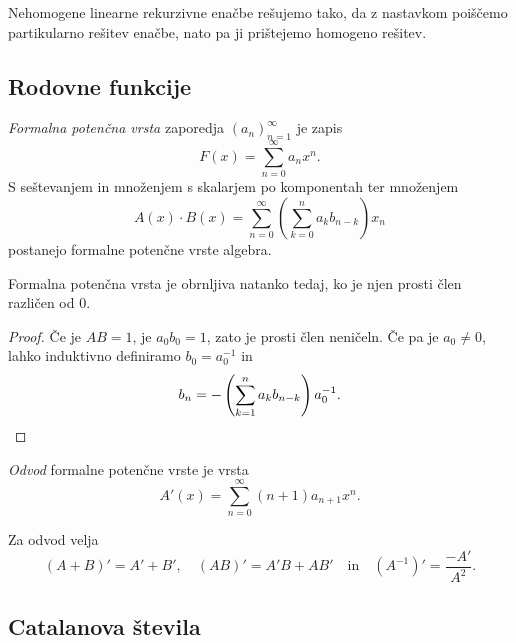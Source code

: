 \begin{opomba}
Nehomogene linearne rekurzivne enačbe rešujemo tako, da z nastavkom
poiščemo partikularno rešitev enačbe, nato pa ji prištejemo
homogeno rešitev.
\end{opomba}

\newpage

\subsection{Rodovne funkcije}


\begin{definicija}
\emph{Formalna potenčna vrsta}
zaporedja $(a_n)_{n=1}^\infty$ je zapis
\[
F(x) = \sum_{n=0}^\infty a_n x^n.
\]
S seštevanjem in množenjem s skalarjem po komponentah ter množenjem
\[
A(x) \cdot B(x) = \sum_{n=0}^\infty
\left(\sum_{k=0}^n a_k b_{n-k}\right) x_n
\]
postanejo formalne potenčne vrste algebra.
\end{definicija}

\begin{trditev}
Formalna potenčna vrsta je obrnljiva natanko tedaj, ko je njen
prosti člen različen od $0$.
\end{trditev}

\begin{proof}
Če je $AB = 1$, je $a_0 b_0 = 1$, zato je prosti člen neničeln.
Če pa je $a_0 \ne 0$, lahko induktivno definiramo $b_0 = a_0^{-1}$
in
\[
b_n = -\left(\sum_{k=1}^n a_k b_{n-k}\right) a_0^{-1}. \qedhere
\]
\end{proof}

\begin{definicija}
\emph{Odvod} formalne potenčne
vrste je vrsta
\[
A'(x) = \sum_{n=0}^\infty (n+1)a_{n+1} x^n.
\]
\end{definicija}

\begin{opomba}
Za odvod velja
\[
(A+B)' = A' + B', \quad (AB)' = A'B+ AB'
\quad \text{in} \quad
(A^{-1})' = \frac{-A'}{A^2}.
\]
\end{opomba}

\newpage

\subsection{Catalanova števila}


